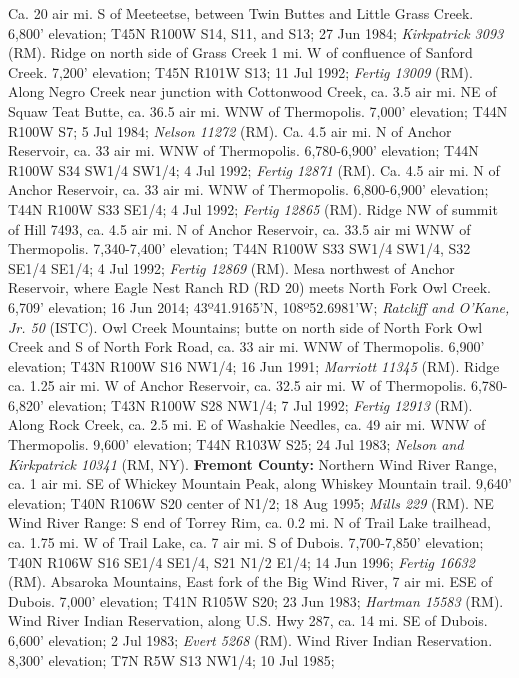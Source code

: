 Ca. 20 air mi. S of Meeteetse, between Twin Buttes and Little Grass Creek.
6,800' elevation; T45N R100W S14, S11, and S13; 27 Jun 1984;
\textit{Kirkpatrick 3093} (RM).
Ridge on north side of Grass Creek 1 mi. W of confluence of Sanford Creek.
7,200' elevation; T45N R101W S13; 11 Jul 1992; \textit{Fertig 13009} (RM).
Along Negro Creek near junction with Cottonwood Creek, ca. 3.5 air mi. NE
of Squaw Teat Butte, ca. 36.5 air mi. WNW of Thermopolis. 7,000' elevation;
T44N R100W S7; 5 Jul 1984; \textit{Nelson 11272} (RM).
Ca. 4.5 air mi. N of Anchor Reservoir, ca. 33 air mi. WNW of Thermopolis.
6,780-6,900' elevation; T44N R100W S34 SW1/4 SW1/4; 4 Jul 1992;
\textit{Fertig 12871} (RM).
Ca. 4.5 air mi. N of Anchor Reservoir, ca. 33 air mi. WNW of Thermopolis.
6,800-6,900' elevation; T44N R100W S33 SE1/4; 4 Jul 1992;
\textit{Fertig 12865} (RM).
Ridge NW of summit of Hill 7493, ca. 4.5 air mi. N of Anchor Reservoir, ca.
33.5 air mi WNW of Thermopolis. 7,340-7,400' elevation; T44N R100W S33 SW1/4
SW1/4, S32 SE1/4 SE1/4; 4 Jul 1992; \textit{Fertig 12869} (RM).
Mesa northwest of Anchor Reservoir, where Eagle Nest Ranch RD (RD 20) meets
North Fork Owl Creek. 6,709' elevation; 16 Jun 2014;
43º41.9165'N, 108º52.6981'W; \textit{Ratcliff and O'Kane, Jr. 50} (ISTC).
Owl Creek Mountains; butte on north side of North Fork Owl Creek and S of
North Fork Road, ca. 33 air mi. WNW of Thermopolis. 6,900' elevation;
T43N R100W S16 NW1/4; 16 Jun 1991; \textit{Marriott 11345} (RM).
Ridge ca. 1.25 air mi. W of Anchor Reservoir, ca. 32.5 air mi. W of Thermopolis.
6,780-6,820' elevation; T43N R100W S28 NW1/4; 7 Jul 1992;
\textit{Fertig 12913} (RM).
Along Rock Creek, ca. 2.5 mi. E of Washakie Needles, ca. 49 air mi. WNW of
Thermopolis. 9,600' elevation; T44N R103W S25; 24 Jul 1983;
\textit{Nelson and Kirkpatrick 10341} (RM, NY).
  \textbf{Fremont County:}
Northern Wind River Range, ca. 1 air mi. SE of Whickey Mountain Peak, along
Whiskey Mountain trail. 9,640' elevation; T40N R106W S20 center of N1/2;
18 Aug 1995; \textit{Mills 229} (RM).
NE Wind River Range: S end of Torrey Rim, ca. 0.2 mi. N of Trail Lake trailhead,
ca. 1.75 mi. W of Trail Lake, ca. 7 air mi. S of Dubois. 7,700-7,850' elevation;
T40N R106W S16 SE1/4 SE1/4, S21 N1/2 E1/4; 14 Jun 1996;
\textit{Fertig 16632} (RM).
Absaroka Mountains, East fork of the Big Wind River, 7 air mi. ESE of Dubois.
7,000' elevation; T41N R105W S20; 23 Jun 1983; \textit{Hartman 15583} (RM).
Wind River Indian Reservation, along U.S. Hwy 287, ca. 14 mi. SE of Dubois.
6,600' elevation; 2 Jul 1983; \textit{Evert 5268} (RM).
Wind River Indian Reservation. 8,300' elevation; T7N R5W S13 NW1/4; 10 Jul 1985;
